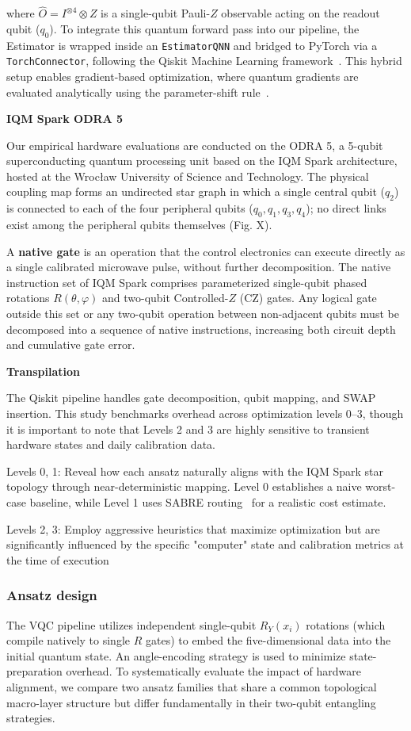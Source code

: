 \documentclass[11pt]{article}
\begin{document}
where $\hat{O} = I^{\otimes 4} \otimes Z$ is a single-qubit Pauli-$Z$ observable acting on the readout qubit ($q_0$).
To integrate this quantum forward pass into our pipeline, the Estimator is wrapped inside an \texttt{EstimatorQNN} and bridged to PyTorch via a \texttt{TorchConnector}, following the Qiskit Machine Learning framework~\cite{qiskitml2025}. This hybrid setup enables gradient-based optimization, where quantum gradients are evaluated analytically using the parameter-shift rule~\cite{schuld2019grad}.

\textbf{IQM Spark ODRA 5}

Our empirical hardware evaluations are conducted on the ODRA 5, a 5-qubit superconducting quantum processing unit based on the IQM Spark architecture, hosted at the Wrocław University of Science and Technology. The physical coupling map forms an undirected star graph in which a single central qubit (\(q_2\)) is connected to each of the four peripheral qubits (\(q_0, q_1, q_3, q_4\)); no direct links exist among the peripheral qubits themselves (Fig. X).

A \textbf{native gate} is an operation that the control electronics can execute directly as a single calibrated microwave pulse, without further decomposition. The native instruction set of IQM Spark comprises parameterized single-qubit phased rotations \(R(\theta, \varphi)\) and two-qubit Controlled-\(Z\) (CZ) gates. Any logical gate outside this set or any two-qubit operation between non-adjacent qubits must be decomposed into a sequence of native instructions, increasing both circuit depth and cumulative gate error. 

\textbf{Transpilation}

The Qiskit pipeline handles gate decomposition, qubit mapping, and SWAP insertion. This study benchmarks overhead across optimization levels 0–3, though it is important to note that Levels 2 and 3 are highly sensitive to transient hardware states and daily calibration data.

Levels 0, 1: Reveal how each ansatz naturally aligns with the IQM Spark star topology through near-deterministic mapping. Level 0 establishes a naive worst-case baseline, while Level 1 uses SABRE routing~\cite{sabre2019} for a realistic cost estimate.

Levels 2, 3: Employ aggressive heuristics that maximize optimization but are significantly influenced by the specific "computer" state and calibration metrics at the time of execution

\subsubsection{Ansatz design}
The VQC pipeline utilizes independent single-qubit $R_Y(x_i)$ rotations (which compile natively to single $R$ gates) to embed the five-dimensional data into the initial quantum state. An angle-encoding strategy is used to minimize state-preparation overhead. To systematically evaluate the impact of hardware alignment, we compare two ansatz families that share a common topological macro-layer structure but differ fundamentally in their two-qubit entangling strategies.
\end{document}
